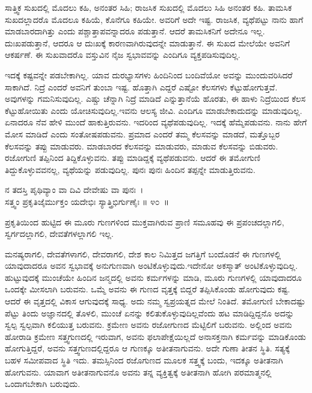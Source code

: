ಸಾತ್ತ್ವಿಕ ಸುಖದಲ್ಲಿ ಮೊದಲು ಕಹಿ, ಅನಂತರ ಸಿಹಿ; ರಾಜಸಿಕ ಸುಖದಲ್ಲಿ ಮೊದಲು ಸಿಹಿ ಅನಂತರ ಕಹಿ. ತಾಮಸಿಕ ಸುಖದಲ್ಲಾದರೊ ಮೊದಲೂ ಕಹಿಯೆ, ಕೊನೆಗೂ ಕಹಿಯೇ. ಅವರಿಗೆ ಅದೇ ಇಷ್ಟ. ರಾಜಸಿಕ, ವ್ಯಥೆಪಟ್ಟು ನಾನು ಹಾಗೆ ಮಾಡಬಾರದಾಗಿತ್ತು ಎಂದು ಪಶ್ಚಾತ್ತಾಪವನ್ನಾದರೂ ಪಡುತ್ತಾನೆ. ಆದರೆ ತಾಮಸಿಕನಿಗೆ ಅದೇನೂ ಇಲ್ಲ. ದುಃಖಪಡುತ್ತಾನೆ, ಆದರೂ ಆ ದುಃಖಕ್ಕೆ ಕಾರಣವಾಗಿರುವುದನ್ನೇ ಮಾಡುತ್ತಾನೆ. ಈ ಸುಖದ ಮೇಲೆಯೇ ಅವನಿಗೆ ಆಕರ್ಷಣೆ. ಈ ಸುಖವಾದರೊ ವಸ್ತುವಿನ ನೈಜ ಸ್ವಭಾವವನ್ನು ಎಂದಿಗೂ ವ್ಯಕ್ತಪಡಿಸುವುದಿಲ್ಲ.

ಇದಕ್ಕೆ ಕಷ್ಟವನ್ನೇ ಪಡಬೇಕಾಗಿಲ್ಲ. ಯಾವ ದುರಭ್ಯಾಸಗಳು ಹಿಂದಿನಿಂದ ಬಂದಿವೆಯೋ ಅವನ್ನು ಮುಂದುವರಿಸಿದರೆ ಸಾಕಾಗಿದೆ. ನಿದ್ರೆ ಎಂದರೆ ಅವನಿಗೆ ತುಂಬಾ ಇಷ್ಟ. ಹೊತ್ತಾಗಿ ಎದ್ದರೆ ಎಷ್ಟೋ ಕೆಲಸಗಳು ಕೆಟ್ಟುಹೋಗುತ್ತವೆ. ಅವುಗಳನ್ನು ಗಮನಿಸುವುದಿಲ್ಲ. ಎಷ್ಚು ಚೆನ್ನಾಗಿ ನಿದ್ರೆ ಮಾಡಿದೆ ಎನ್ನುತ್ತಾನೆಯೆ ಹೊರತು, ಈ ಹಾಳು ನಿದ್ರೆಯಿಂದ ಕೆಲಸ ಕೆಟ್ಟು\-ಹೋಯಿತು ಎಂದು ಯೋಚಿಸುವುದಿಲ್ಲ.ಇವನು ಆಲಸ್ಯ ಜೀವಿ. ಎಂದಿಗೂ ಮಾಡಬೇಕಾದುದನ್ನು ಮಾಡುವುದಿಲ್ಲ. ಏನಾದರೂ ನೆವ ಹೇಳಿ ಮುಂದೆ ಹಾಕುತ್ತಿರುವನು. ಇದರಿಂದ ವ್ಯಥೆಪಡುವುದಿಲ್ಲ. ಇದಕ್ಕೆ ಹೆಮ್ಮೆಪಡುವನು. ನಾನು ಹೇಗೆ ಮೋಸ ಮಾಡಿದೆ ಎಂದು ಸಂತೋಷಪಡುವನು. ಪ್ರಮಾದ ಎಂದರೆ ತಮ್ಮ ಕೆಲಸವನ್ನು ಮಾಡದೆ, ಮತ್ತೊಬ್ಬರ ಕೆಲಸವನ್ನು ತಪ್ಪು ಮಾಡುವರು. ಮಾಡಬಾರದ ಕೆಲಸವನ್ನು ಮಾಡುವರು, ಮಾಡುವ ಕೆಲಸವನ್ನು ಬಿಡುವರು. ರಜೋಗುಣಿ ತಪ್ಪಿನಿಂದ ತಿದ್ದಿಕೊಳ್ಳುವನು. ತಪ್ಪು ಮಾಡಿದ್ದಕ್ಕೆ ವ್ಯಥೆಪಡುವನು. ಆದರೆ ಈ ತಮೋಗುಣಿ ತಿದ್ದುಕೊಳ್ಳುವವನಲ್ಲ, ವ್ಯಥೆಯನ್ನು ಪಡುವುದಿಲ್ಲ. ಪುನಃ ಪುನಃ ಹಿಂದಿನ ತಪ್ಪನ್ನೇ ಮಾಡುತ್ತಿರುವನು.

\begin{shloka}
ನ ತದಸ್ತಿ ಪೃಥಿವ್ಯಾಂ ವಾ ದಿವಿ ದೇವೇಷು ವಾ ಪುನಃ~।\\ಸತ್ತ್ವಂ ಪ್ರಕೃತಿಜೈರ್ಮುಕ್ತಂ ಯದೇಭಿಃ ಸ್ಯಾತ್ತ್ರಿಭಿರ್ಗುಣೈಃ \hfill॥ ೪೦~॥
\end{shloka}

\begin{artha}
ಪ್ರಕೃತಿಯಿಂದ ಹುಟ್ಟಿದ ಈ ಮೂರು ಗುಣಗಳಿಂದ ಮುಕ್ತವಾಗಿರುವ ಪ್ರಾಣಿ ಸಮೂಹವು ಈ ಪ್ರಪಂಚದಲ್ಲಾಗಲಿ, ಸ್ವರ್ಗದಲ್ಲಾಗಲಿ, ದೇವತೆಗಳಲ್ಲಾಗಲಿ ಇಲ್ಲ.
\end{artha}

ಮನಷ್ಯರಾಗಲಿ, ದೇವತೆಗಳಾಗಲಿ, ದೇವರಾಗಲಿ, ದೇಶ ಕಾಲ ನಿಮಿತ್ತದ ಜಗತ್ತಿಗೆ ಬಂದೊಡನೆ ಈ ಗುಣಗಳಲ್ಲಿ ಯಾವುದಾದರೂ ಅವನ ಸ್ವಭಾವಕ್ಕೆ ಅನುಗುಣವಾಗಿ ಅಂಟಿಕೊಳ್ಳುವುದು.\break ಇದೇನೋ ಅಕಸ್ಮಾತ್ ಅಂಟಿಕೊಳ್ಳುವುದಿಲ್ಲ. ಹುಟ್ಟುವುದಕ್ಕೆ ಮುಂಚೆಯೇ ಹಿಂದಿನ ಜನ್ಮದಲ್ಲಿ ಅವನು ಕರ್ಮಗಳನ್ನು ಮಾಡಿ, ಮೂರು ಗುಣಗಳಲ್ಲಿ ಯಾವುದಾದರೂ ಒಂದಕ್ಕೇ ಮೀಸಲಾಗಿ ಬರುವನು. ಒಮ್ಮೆ ಅವನು ಈ ಗುಣದ ವೃತ್ತಕ್ಕೆ ಬಿದ್ದರೆ ತಪ್ಪಿಸಿಕೊಂಡು ಹೋಗುವುದು ಕಷ್ಟ. ಆದರೆ ಈ ವೃತ್ತದಲ್ಲಿ ವಿಕಾಸ ಆಗುವುದಕ್ಕೆ ಸಾಧ್ಯ. ಅದು ನಮ್ಮ ಸ್ವಪ್ರಯತ್ನದ ಮೇಲೆ ನಿಂತಿದೆ. ತಮೋಗುಣಿ ಬೇಕಾದಷ್ಟು ಪೆಟ್ಟು ತಿಂದು ಅಜ್ಞಾನದಲ್ಲಿ ತೊಳಲಿ, ಮುಂಚೆ ಏನನ್ನು ಕಲಿತುಕೊಳ್ಳುವು\-ದಿಲ್ಲವೆಂದು ಹಟ ಮಾಡಿದ್ದಿದ್ದನೊ ಅದನ್ನು ಸ್ವಲ್ಪ ಸ್ವಲ್ಪವಾಗಿ ಕಲಿಯುತ್ತ ಬರುವನು. ಕ್ರಮೇಣ ಅವನು ರಜೋಗುಣದ ಮೆಟ್ಟಿಲಿಗೆ ಬರುವನು. ಅಲ್ಲಿಂದ ಅವನು ಹೋರಾಡಿ ಕ್ರಮೇಣ ಸತ್ತ್ವಗುಣದಲ್ಲಿ ಇರುವಾಗ, ಅವನು ಫಲಾಪೇಕ್ಷೆಯಿಲ್ಲದೆ ಅನಾಸಕ್ತನಾಗಿ ಕರ್ಮವನ್ನು ಮಾಡಿಕೊಂಡು ಹೋಗುತ್ತಿದ್ದರೆ, ಅವನು ಸತ್ತ್ವಗುಣದಲ್ಲಿದ್ದರೂ ಆ ಗುಣಕ್ಕೂ ಅತೀತನಾಗುವನು. ಅದೇ ಗುಣಾ ತೀತನ ಸ್ಥಿತಿ. ಸತ್ಯಕ್ಕೆ ಬಹಳ ಸಮೀಪವಾದ ಸ್ಥಿತಿ ಇದು. ತಮಸ್ಸಿನಿಂದ ರಜೊಗುಣದ ಮೂಲಕ ಸತ್ತ್ವಕ್ಕೆ ಬಂದು, ಇದಕ್ಕೂ ಅತೀತನಾಗಿ ಹೋಗುವನು. ಯಾವಾಗ ಅತೀತನಾಗುವನೊ ಅವನು ತನ್ನ ವ್ಯಕ್ತಿತ್ವಕ್ಕೆ ಅತೀತನಾಗಿ ಹೋಗಿ ಪರಮಾತ್ಮನಲ್ಲಿ ಒಂದಾಗಬೇಕಾಗಿ ಬರುವುದು.

